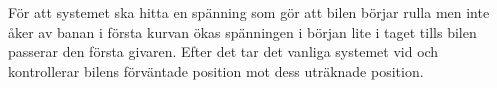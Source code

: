 För att systemet ska hitta en spänning som gör att bilen börjar rulla men inte
åker av banan i första kurvan ökas spänningen i början lite i taget tills bilen
passerar den första givaren. Efter det tar det vanliga systemet vid och
kontrollerar bilens förväntade position mot dess uträknade position.

